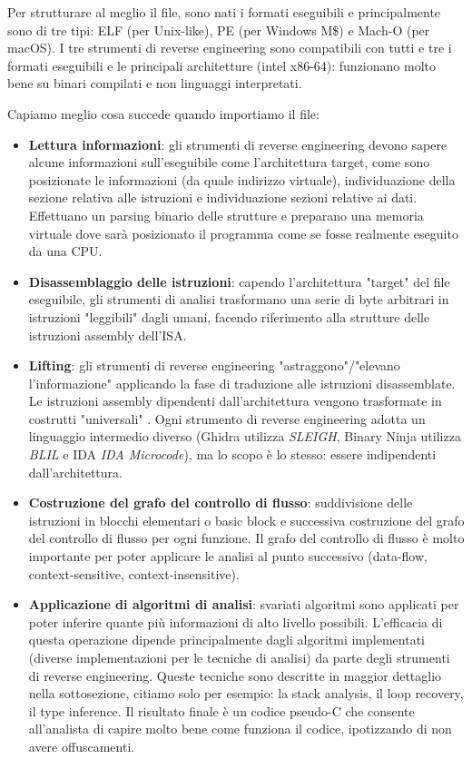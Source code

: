 \documentclass[oneside,a4paper,11pt]{book}
\theoremstyle{italicstyle}
\theoremstyle{normStyle}
\begin{document}
Per strutturare al meglio il file, sono nati i formati eseguibili e principalmente sono di tre tipi: ELF (per Unix-like), PE (per Windows M\$) e Mach-O (per macOS). I tre strumenti di reverse engineering sono compatibili con tutti e tre i formati eseguibili e le principali architetture (intel x86-64): funzionano molto bene su binari compilati e non linguaggi interpretati. 

Capiamo meglio cosa succede quando importiamo il file:

\begin{itemize}
    \item \textbf{Lettura informazioni}: gli strumenti di reverse engineering devono sapere alcune informazioni sull'eseguibile come l'architettura target, come sono posizionate le informazioni (da quale indirizzo virtuale), individuazione della sezione relativa alle istruzioni e individuazione sezioni relative ai dati. Effettuano un parsing binario delle strutture e preparano una memoria virtuale dove sarà posizionato il programma come se fosse realmente eseguito da una CPU.
    \item \textbf{Disassemblaggio delle istruzioni}: capendo l'architettura "target" del file eseguibile, gli strumenti di analisi trasformano una serie di byte arbitrari in istruzioni "leggibili" dagli umani, facendo riferimento alla strutture delle istruzioni assembly dell'ISA.
    \item \textbf{Lifting}: gli strumenti di reverse engineering "astraggono"/"elevano l'informazione" applicando la fase di traduzione alle istruzioni disassemblate. Le istruzioni assembly dipendenti dall'architettura vengono trasformate in costrutti "universali" . Ogni strumento di reverse engineering adotta un linguaggio intermedio diverso (Ghidra utilizza \textit{SLEIGH}, Binary Ninja utilizza \textit{BLIL} e IDA \textit{IDA Microcode}), ma lo scopo è lo stesso: essere indipendenti dall'architettura.
    \item \textbf{Costruzione del grafo del controllo di flusso}: suddivisione delle istruzioni in blocchi elementari o basic block e successiva costruzione del grafo del controllo di flusso per ogni funzione. Il grafo del controllo di flusso è molto importante per poter applicare le analisi al punto successivo (data-flow, context-sensitive, context-insensitive). 
    \item \textbf{Applicazione di algoritmi di analisi}: svariati algoritmi sono applicati per poter inferire quante più informazioni di alto livello possibili. L'efficacia di questa operazione dipende principalmente dagli algoritmi implementati (diverse implementazioni per le tecniche di analisi) da parte degli strumenti di reverse engineering. Queste tecniche sono descritte in maggior dettaglio nella sottosezione, citiamo solo per esempio: la stack analysis, il loop recovery, il type inference. Il risultato finale è un codice pseudo-C che consente all'analista di capire molto bene come funziona il codice, ipotizzando di non avere offuscamenti.
\end{itemize}
\end{document}
